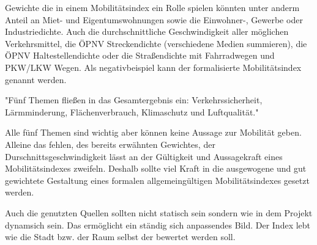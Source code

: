 Gewichte die in einem Mobilitätsindex ein Rolle spielen könnten unter anderm Anteil an Miet- und Eigentumswohnungen sowie die Einwohner-, 
Gewerbe oder Industriedichte. Auch die durchschnittliche Geschwindigkeit aller möglichen Verkehrsmittel, 
die ÖPNV Streckendichte (verschiedene Medien summieren), die ÖPNV Haltestellendichte oder die Straßendichte mit Fahrradwegen und PKW/LKW Wegen.
Als negativbeispiel kann der formalisierte Mobilitätsindex genannt werden.





"Fünf Themen fließen in das Gesamtergebnis ein: Verkehrssicherheit, Lärmminderung, Flächenverbrauch, Klimaschutz und Luftqualität."


Alle fünf Themen sind wichtig aber können keine Aussage zur Mobilität geben. Alleine das fehlen, des bereits erwähnten Gewichtes, der Durschnittsgeschwindigkeit lässt an der Gültigkeit und Aussagekraft eines Mobilitätsindexes zweifeln.
Deshalb sollte viel Kraft in die ausgewogene und gut gewichtete Gestaltung eines formalen allgemeingültigen Mobilitätsindexes gesetzt werden.

Auch die genutzten Quellen sollten nicht statisch sein sondern wie in dem Projekt dynamsich sein. Das ermöglicht ein ständig sich anpassendes Bild. Der Index lebt wie die Stadt bzw. der Raum selbst der bewertet werden soll.
